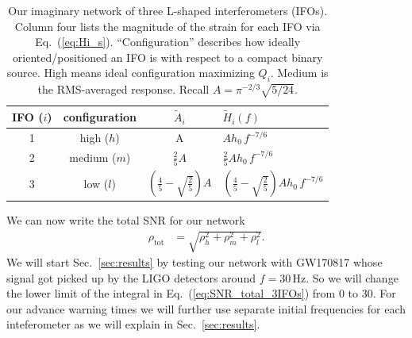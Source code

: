 \documentclass[11pt,a4paper]{article}
\newcommand{\f}{\frac}
\newcommand{\nn}{\nonumber}
\newcommand\T{\rule{0pt}{2.6ex}}       %
\newcommand\B{\rule[-1.2ex]{0pt}{0pt}} %
\begin{document}
\begin{table}[h]
\centering
\begin{tabular}{c||c|c|l}
 IFO ($i$) & configuration %
 & $\tilde{A}_i$ & $\tilde{H}_i(f)$\\
 \hline
 \hline
 1 & high ($h$) &  A & $A h_0\, f^{-7/6}$ \T\\
 2 & medium ($m$) & $\tfrac{2}{5}A$ & $ \tfrac{2}{5}A h_0 \, f^{-7/6}$\B\T \\
 3 & low ($l$)  & $\left(\tfrac{4}{5}-\sqrt{\tfrac{2}{5}}\right)A$ & $ \left(\tfrac{4}{5}-\sqrt{\tfrac{2}{5}}\right)A h_0 \, f^{-7/6}$\B \\
 \hline
\end{tabular}
\caption{%
Our imaginary network of three L-shaped interferometers (IFOs). Column four lists the magnitude of the strain for each IFO via Eq.~(\ref{eq:Hi_s}).
``Configuration'' describes how ideally oriented/positioned an IFO is with respect to a compact binary source. High means ideal configuration maximizing $Q_i$.
Medium is the RMS-averaged response. Recall $A= \pi^{-2/3} \sqrt{5/24}$. 
}\label{table:network_params}
\end{table}
%
%
We can now write the total SNR for our network
%
\begin{align}
\rho_\text{tot} &= \sqrt{\rho^2_h+\rho^2_m+\rho^2_l} \label{eq:SNR_total_3IFOs} .
\end{align}
%
We will start Sec.~\ref{sec:results} by testing our network with GW170817 whose signal got picked up by the LIGO detectors around $f=30$\,Hz.
So we will change the lower limit of the integral in Eq.~(\ref{eq:SNR_total_3IFOs}) from $0$ to $30$.
For our advance warning times we will further use separate initial frequencies for each inteferometer as we will explain in Sec.~\ref{sec:results}.
\end{document}

